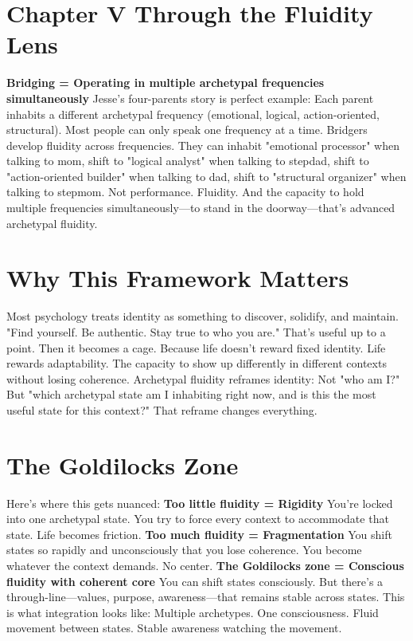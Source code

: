 \documentclass[12pt,openany]{book}
\begin{document}
\section{Chapter V Through the Fluidity Lens}

\textbf{Bridging = Operating in multiple archetypal frequencies simultaneously}
Jesse's four-parents story is perfect example:
Each parent inhabits a different archetypal frequency (emotional, logical, action-oriented, structural). Most people can only speak one frequency at a time.
Bridgers develop fluidity across frequencies.
They can inhabit "emotional processor" when talking to mom, shift to "logical analyst" when talking to stepdad, shift to "action-oriented builder" when talking to dad, shift to "structural organizer" when talking to stepmom.
Not performance. Fluidity.
And the capacity to hold multiple frequencies simultaneously—to stand in the doorway—that's advanced archetypal fluidity.

\section{Why This Framework Matters}

Most psychology treats identity as something to discover, solidify, and maintain.
"Find yourself. Be authentic. Stay true to who you are."
That's useful up to a point. Then it becomes a cage.
Because life doesn't reward fixed identity. Life rewards adaptability. The capacity to show up differently in different contexts without losing coherence.
Archetypal fluidity reframes identity:
Not "who am I?" But "which archetypal state am I inhabiting right now, and is this the most useful state for this context?"
That reframe changes everything.

\section{The Goldilocks Zone}

Here's where this gets nuanced:
\textbf{Too little fluidity = Rigidity}
You're locked into one archetypal state. You try to force every context to accommodate that state. Life becomes friction.
\textbf{Too much fluidity = Fragmentation}
You shift states so rapidly and unconsciously that you lose coherence. You become whatever the context demands. No center.
\textbf{The Goldilocks zone = Conscious fluidity with coherent core}
You can shift states consciously. But there's a through-line—values, purpose, awareness—that remains stable across states.
This is what integration looks like:
Multiple archetypes. One consciousness. Fluid movement between states. Stable awareness watching the movement.
\end{document}
